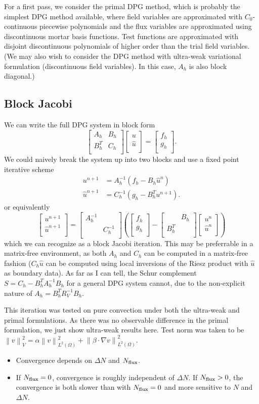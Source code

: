\documentclass{article}
\newcommand{\grad}{\nabla}
\newcommand{\nor}[1]{\left\| #1 \right\|}
\newcommand{\LRp}[1]{\left( #1 \right)}
\newcommand{\uh}{\widehat{u}}
\renewcommand{\L}{L^2\LRp{\Omega}}
\def\arr#1#2#3#4{\left[
\begin{array}{cc}
#1 & #2\\
#3 & #4\\
\end{array}
\right]}
\def\vecttwo#1#2{\left[
\begin{array}{c}
#1\\
#2\\
\end{array}
\right]}
\begin{document}
For a first pass, we consider the primal DPG method, which is probably the simplest DPG method available, where field variables are approximated with $C_0$-continuous piecewise polynomials and the flux variables are approximated using discontinuous mortar basis functions.  Test functions are approximated with disjoint discontinuous polynomials of higher order than the trial field variables.  (We may also wish to consider the DPG method with ultra-weak variational formulation (discontinuous field variables).  In this case, $A_h$ is also block diagonal.)

\subsection{Block Jacobi}

We can write the full DPG system in block form
\[
\arr{A_h}{B_h}{B_h^T}{C_h}\vecttwo{u}{\uh} = \vecttwo{f_h}{g_h}.
\]
We could naively break the system up into two blocks and use a fixed point iterative scheme
\begin{align*}
u^{n+1} &= A_h^{-1}(f_h-B_h\uh^{n})\\
\uh^{n+1} &= C_h^{-1}(g_h-B_h^Tu^{n+1}).
\end{align*}
or equivalently
\[
\vecttwo{u^{n+1}}{\uh^{n+1}} = \arr{A_h^{-1}}{}{}{C_h^{-1}}\LRp{\vecttwo{f_h}{g_h} - \arr{}{B_h}{B_h^T}{}\vecttwo{u^n}{\uh^n}}
\]
which we can recognize as a block Jacobi iteration.  This may be preferrable in a matrix-free environment, as both $A_h$ and $C_h$ can be computed in a matrix-free fashion ($C_h\uh$ can be computed using local inversions of the Riesz product with $\uh$ as boundary data).  As far as I can tell, the Schur complement $S = C_h-B_h^TA_h^{-1}B_h$ for a general DPG system cannot, due to the non-explicit nature of $A_h = B_h^TR_V^{-1}B_h$.

This iteration was tested on pure convection under both the ultra-weak and primal formulations.  As there was no observable difference in the primal formulation, we just show ultra-weak results here.  Test norm was taken to be $\nor{v}_V^2 = \alpha\nor{v}_{\L}^2 + \nor{\beta\cdot\grad v}_{\L}^2$.  
\begin{itemize}
\item Convergence depends on $\Delta N$ and $N_{\rm flux}$.  
\item If $N_{\rm flux} = 0$, convergence is roughly independent of $\Delta N$.  If $N_{\rm flux} > 0$, the convergence is both slower than with $N_{\rm flux} = 0$ and more sensitive to $N$ and $\Delta N$.
\end{itemize}
\end{document}
